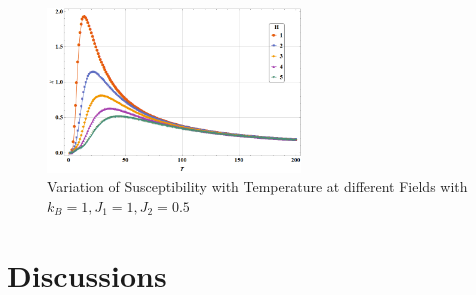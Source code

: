 \documentclass[24pt]{article}
\begin{document}
\begin{figure}[h!]
\centering
	\includegraphics[width=0.6\textwidth]{Susceptibility Vs Temperature.png}
	\caption{Variation of Susceptibility with Temperature at different Fields with $k_B =1, J_1 = 1, J_2 = 0.5$}
	\end{figure}
 
\newpage

\section{{\Large Discussions}}
\end{document}
